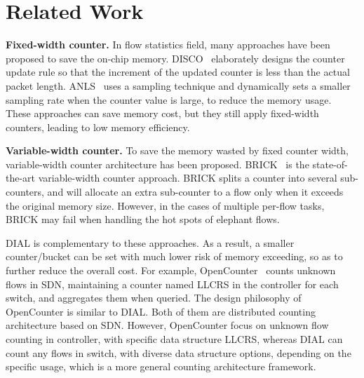 \section{Related Work}\label{sec:rel}
\textbf{Fixed-width counter.}
In flow statistics field, many approaches have been proposed to save the on-chip memory.
DISCO~\cite{Hu2010} elaborately designs the counter update rule so that the increment of the updated counter is less than the actual packet length.
ANLS~\cite{Hu2012} uses a sampling technique and dynamically sets a smaller sampling rate when the counter value is large, to reduce the memory usage.
These approaches can save memory cost, but they still apply fixed-width counters, leading to low memory efficiency.

\textbf{Variable-width counter.}
To save the memory wasted by fixed counter width, variable-width counter architecture has been proposed.
BRICK~\cite{Hua2008} is the state-of-the-art variable-width counter approach.
BRICK splits a counter into several sub-counters, and will allocate an extra sub-counter to a flow only when it exceeds the original memory size.
However, in the cases of multiple per-flow tasks, BRICK may fail when handling the hot spots of elephant flows.

DIAL is complementary to these approaches.
As a result, a smaller counter/bucket can be set with much lower risk of memory exceeding, so as to further reduce the overall cost.
For example, OpenCounter~\cite{Callegari2015} counts unknown flows in SDN, maintaining a counter named LLCRS in the controller for each switch, and aggregates them when queried. 
The design philosophy of OpenCounter is similar to DIAL. 
Both of them are distributed counting architecture based on SDN. 
However, OpenCounter focus on unknown flow counting in controller, with specific data structure LLCRS, whereas DIAL can count any flows in switch, with diverse data structure options, depending on the specific usage, which is a more general counting architecture framework.